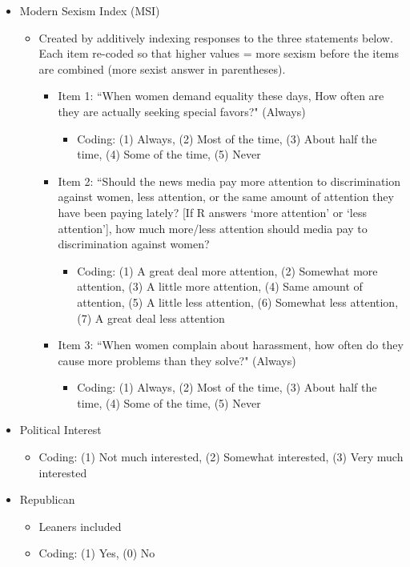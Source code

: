 \documentclass[12pt]{article}
\begin{document}
\begin{appendices}
\begin{refsection}
\begin{itemize}
	\item Modern Sexism Index (MSI)
		\begin{itemize}
			\item Created by additively indexing responses to the three statements below. Each item re-coded so that higher values = more sexism before the items are combined (more sexist answer in parentheses). 
			\begin{itemize}
				\item Item 1: ``When women demand equality these days, How often are they are actually seeking special favors?" (Always)
				\begin{itemize}
					\item Coding: (1) Always, (2) Most of the time, (3) About half the time, (4) Some of the time, (5) Never
				\end{itemize}
				\item Item 2: ``Should the news media pay more attention to discrimination against women, less attention, or the same amount of attention they have been paying lately? [If R answers `more attention' or `less attention'], how much more/less attention should media pay to discrimination against women?
				\begin{itemize}
					\item Coding: (1) A great deal more attention, (2) Somewhat more attention, (3) A little more attention, (4) Same amount of attention, (5) A little less attention, (6) Somewhat less attention, (7) A great deal less attention
				\end{itemize}
				\item Item 3: ``When women complain about harassment, how often do they cause more problems than they solve?" (Always)
				\begin{itemize}
					\item Coding: (1) Always, (2) Most of the time, (3) About half the time, (4) Some of the time, (5) Never
				\end{itemize}
			\end{itemize}
		\end{itemize}
		
	\item Political Interest
		\begin{itemize}
			\item Coding: (1) Not much interested, (2) Somewhat interested, (3) Very much interested
		\end{itemize}
		
	\item Republican  
		\begin{itemize}
			\item Leaners included
			\item Coding: (1) Yes, (0) No
		\end{itemize}
		

\end{itemize}
\end{refsection}
\end{appendices}
\end{document}

